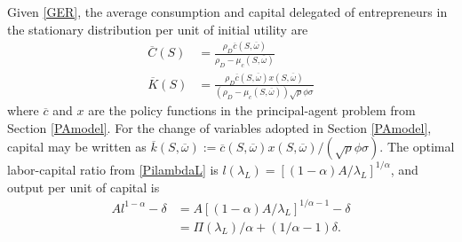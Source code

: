 \documentclass[11pt]{article}
\theoremstyle{plain}
\theoremstyle{definition} %
\begin{document}
Given \eqref{GER}, the average consumption and capital delegated of entrepreneurs in the stationary distribution per unit of initial utility are
\begin{equation}
\begin{aligned} %
\overline{C}(S) & = \frac{\rho_D\overline{c}(S, \overline{\omega})}{\rho_D - \mu_c(S,\overline{\omega})} 
\\ \overline{K}(S) & = \frac{\rho_D\overline{c}(S, \overline{\omega})x(S, \overline{\omega})}{(\rho_D - \mu_c(S,\overline{\omega}))\sqrt{\rho}\phi \sigma} 
\end{aligned}
\label{bigCK}
\end{equation}
where $\overline{c}$ and $x$ are the policy functions in the principal-agent problem from Section \ref{PAmodel}. For the change of variables adopted in Section \ref{PAmodel}, capital may be written as $\overline{k}(S,\overline{\omega}) := \overline{c}(S,\overline{\omega})x(S,\overline{\omega})/(\sqrt{\rho}\phi \sigma)$. The optimal labor-capital ratio from \eqref{PilambdaL} is $l(\lambda_L) = [(1-\alpha)A/\lambda_L]^{1/\alpha}$, and output per unit of capital is
\begin{equation}
\begin{aligned}
A l^{1-\alpha} - \delta & = A[(1-\alpha)A/\lambda_L]^{1/\alpha-1} - \delta
\\ & = \Pi(\lambda_L)/\alpha + (1/\alpha - 1)\delta.
\label{outputPI}
\end{aligned}
\end{equation}

\iffalse
\begin{equation}
\Pi(\lambda_L) := \max_{l\geq 0} A l^{1-\alpha} - \lambda_Ll - \delta = \alpha A^{1/\alpha} [(1-\alpha)/\lambda_L]^{1/\alpha-1} - \delta
\label{PilambdaL}
\end{equation}
The optimal labor-capital ratio is $l(\lambda_L) = [(1-\alpha)A]^{1/\alpha}\lambda_L^{-1/\alpha}$ and the marginal product of capital is $\Pi(\lambda_L) = \alpha(1-\alpha)^{1/\alpha-1}A^{1/\alpha}\lambda_L^{1-1/\alpha} - \delta$. These last two expression imply 
$(\Pi(\lambda_L) + \delta)/\alpha = A[(1-\alpha)A]^{1/\alpha-1}\lambda_L^{1-1/\alpha} = Al(\lambda_L)^{1-\alpha}$.
\fi
\end{document}
